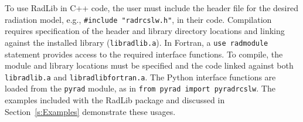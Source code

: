 \documentclass[preprint,12pt]{elsarticle}
\begin{document}
    To use RadLib in C++ code, the user must include the header file for the desired radiation model, e.g.,
    \texttt{\#include "rad\textunderscore rcslw.h"}, in their code. Compilation requires specification of the header
    and library directory locations and linking against the installed library (\texttt{libradlib.a}). In Fortran,
    a \texttt{use rad\textunderscore module} statement provides access to the required interface functions. To
    compile, the module and library locations must be specified and the code linked against both
    \texttt{libradlib.a} and \texttt{libradlib\textunderscore fortran.a}. The Python interface functions are loaded
    from the \texttt{pyrad} module, as in \texttt{from pyrad import pyrad\textunderscore rcslw}. The examples
    included with the RadLib package and discussed in Section~\ref{s:Examples} demonstrate these usages.
\end{document}
